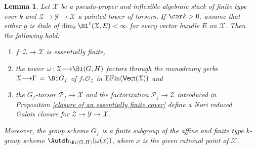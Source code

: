 \documentclass[12pt,reqno]{amsart}
\theoremstyle{plain}
\newtheorem{lem}[thm]{Lemma}
\theoremstyle{definition}
\numberwithin{thm}{section}
\newcounter{x}\setcounter{x}{1}
\theoremstyle{plain}
\begin{document}
\begin{lem}\label{Galois closure for essentially finite towers}
Let ${\mathcal{X}}$ be a pseudo-proper and inflexible algebraic stack of finite type over $k$ and
${\mathcal{Z}}{\longrightarrow} {\mathcal{Y}}{\longrightarrow} {\mathcal{X}}$ a pointed tower of torsors. If $\car k > 0$, assume that either $g$ is
\'etale of $\dim_k \Hl^1({\mathcal{X}},E)<\infty$ for every vector bundle $E$ on ${\mathcal{X}}$.
Then the following hold:
\begin{enumerate}
\item $f\colon {\mathcal{Z}}{\longrightarrow} {\mathcal{X}}$ is essentially finite,

\item the tower $\omega\colon {\mathcal{X}}{\longrightarrow}\Bi(G,H)$ factors through the monodromy gerbe
${\mathcal{X}}{\longrightarrow} \Gamma\,=\,\Bi G_f$ of $f_*{\mathcal{O}_{\mathcal{Z}}}$ in ${{\rm EFin}}({\text{\sf Vect}}({\mathcal{X}}))$ and

\item the $G_f$-torsor ${\mathcal{P}}_f{\longrightarrow} {\mathcal{X}}$ and the factorization ${\mathcal{P}}_f{\longrightarrow} {\mathcal{Z}}$ introduced
in Proposition \ref{closure of an essentially finite cover} define a Nori reduced Galois closure for
${\mathcal{Z}}{\longrightarrow}{\mathcal{Y}}{\longrightarrow}{\mathcal{X}}$.
\end{enumerate}
Moreover, the group scheme $G_f$ is a finite subgroup of the affine and finite type $k$-group scheme
$\Autsh_{\Bi(G,H)}(\omega(x))$, where $x$ is the given rational point of ${\mathcal{X}}$.
\end{lem}
\end{document}

